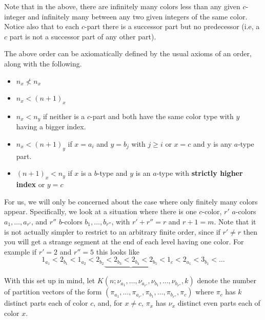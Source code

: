 \documentclass[12pt,a4paper]{amsart}
\theoremstyle{definition}
\theoremstyle{notation}
\theoremstyle{corollary}
\begin{document}
Note that in the above, there are infinitely many colors less than any given $c$-integer and infinitely many between any two given integers of the same color. Notice also that to each $c$-part there is a successor part but no predecessor (i.e, a $c$ part is not a successor part of any other part).


The above order can be axiomatically defined by the usual axioms of an order, along with the following. 
\begin{itemize}
    \item $n_x\not<n_x$
    \item $n_x<(n+1)_x$
    \item $n_x<n_y$ if neither is a $c$-part and both have the same color type with $y$ having a bigger index.
    \item $n_x<(n+1)_y$ if $x=a_i$ and $y=b_j$ with $j\geq i$ or $x=c$ and y is any $a$-type part. 
    \item $(n+1)_x<n_y$ if $x$ is a $b$-type and $y$ is an $a$-type with \textbf{strictly higher index} or $y=c$ 
    
\end{itemize}

For us, we will only be concerned about the case where only finitely many colors appear. Specifically, we look at a situation where there is one $c$-color, $r'$ $a$-colors $a_1,\dots, a_{r'}$, and $r''$ $b$-colors $b_1,\dots,b_{r''}$, with $r'+r''=r$ and $r+1=m$. Note that it is not actually simpler to restrict to an arbitrary finite order, since if $r'\not=r$ then you will get a strange segment at the end of each level having one color. For example if $r'=2$ and $r''=5$ this looks like
$$1_{a_1}<2_{b_1}<1_{a_{2}}<2_{b_2}\underbrace{<2_{b_3}<2_{b_4}<2_{b_5}}<1_c<2_{a_1}<3_{b_1}<\dots$$

With this set up in mind, let $K(n;\nu_{a_1},\dots,\nu_{a_{r'}},\nu_{b_1},\dots,\nu_{b_{r''}},k)$ denote the number of partition vectors of the form $(\pi_{a_1},\dots,\pi_{a_{r'}},\pi_{b_1},\dots,\pi_{b_{r''}},\pi_c)$ where $\pi_c$ has $k$ distinct parts each of color $c$, and, for $x\not=c$, $\pi_x$ has $\nu_x$ distinct even parts each of color $x$.\\
\end{document}
